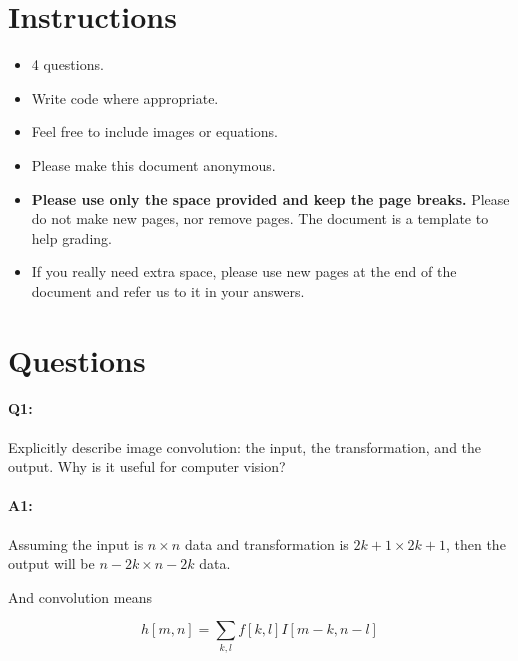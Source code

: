 	\maketitle
	\vspace{-3cm}
	\thispagestyle{fancy}
	
	\section*{Instructions}
	\begin{itemize}
		\item 4 questions.
		\item Write code where appropriate.
		\item Feel free to include images or equations.
		\item Please make this document anonymous.
		\item \textbf{Please use only the space provided and keep the page breaks.} Please do not make new pages, nor remove pages. The document is a template to help grading.
		\item If you really need extra space, please use new pages at the end of the document and refer us to it in your answers.
	\end{itemize}

	\section*{Questions}
	
	\paragraph{Q1:} Explicitly describe image convolution: the input, the transformation, and the output. Why is it useful for computer vision?
	
	\paragraph{A1:} Assuming the input is $n\times n$ data and transformation is $2k+1\times 2k+1$, then the output will be $n-2k\times n-2k$ data.
	
	And convolution means
	\begin{LARGE} $$h[m,n] = \sum_{k,l} f[k,l]I[m-k,n-l]$$ \end{LARGE}
	
	
	\pagebreak
